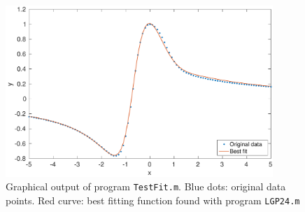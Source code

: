 \documentclass[12pt,titlepage]{article}
\begin{document}
\begin{figure}[hbtp]
\centering
\includegraphics[width=0.9\textwidth]{Figures/4_fit}
\caption{\footnotesize Graphical output of program \texttt{TestFit.m}. Blue dots: original data points. Red curve: best fitting function found with program \texttt{LGP24.m}}
\label{fig:4_fit}
\end{figure}
\end{document}

